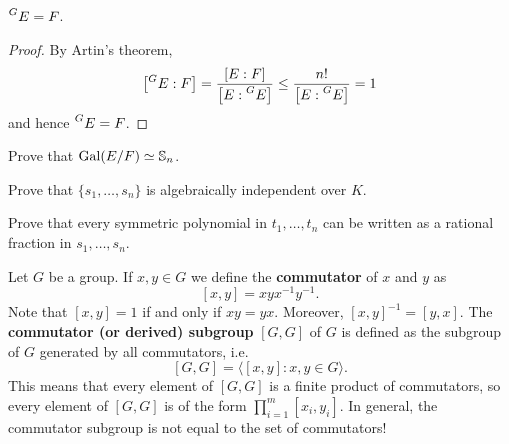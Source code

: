 \begin{theorem}
    $\prescript{G}{}{E}=F$.
\end{theorem}

\begin{proof}
    By Artin's theorem,
    \[
    \left[\prescript{G}{}{E}:F\right]=\frac{[E:F]}{\left[E:\prescript{G}{}{E}\right]}
    \leq\frac{n!}{\left[E:\prescript{G}{}{E}\right]}=1
    \]
    and hence $\prescript{G}{}{E}=F$.
\end{proof}

\begin{exercise}
    Prove that $\operatorname{Gal}(E/F)\simeq\mathbb{S}_n$.
\end{exercise}

\begin{exercise}
    Prove that $\{s_1,\dots,s_n\}$ is algebraically independent over $K$. 
\end{exercise}

\begin{exercise}
    Prove that every symmetric polynomial in $t_1,\dots,t_n$ can be written as a rational
    fraction in $s_1,\dots,s_n$. 
\end{exercise}


Let $G$ be a group. If $x,y\in G$ we define
the \textbf{commutator} of $x$ and $y$ as
\[
[x,y]=xyx^{-1}y^{-1}.
\]
Note that $[x,y]=1$ if and only if $xy=yx$. 
Moreover, $[x,y]^{-1}=[y,x]$. 
The
\textbf{commutator (or derived) subgroup} $[G,G]$ of $G$ is defined as
the subgroup of $G$ generated by all commutators, i.e. 
\[
[G,G]=\langle [x,y]:x,y\in G\rangle.
\]
This means that every element of $[G,G]$ is a finite product of commutators, 
so every element of $[G,G]$ is of the form $\prod_{i=1}^m [x_i,y_i]$. 
In general, the commutator subgroup is not equal to the set of commutators!

